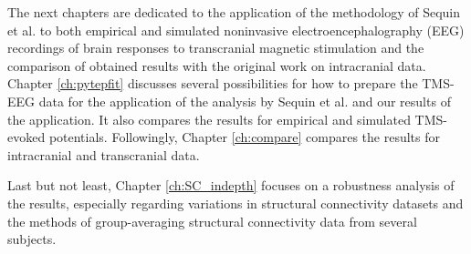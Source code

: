 The next chapters are dedicated to the application of the methodology of Sequin et al. to both empirical and simulated noninvasive electroencephalography (EEG) recordings of brain responses to transcranial magnetic stimulation and the comparison of obtained results with the original work on intracranial data. Chapter \ref{ch:pytepfit} discusses several possibilities for how to prepare the TMS-EEG data for the application of the analysis by Sequin et al. and our results of the application. It also compares the results for empirical and simulated TMS-evoked potentials. Followingly, Chapter \ref{ch:compare} compares the results for intracranial and transcranial data.

Last but not least, Chapter \ref{ch:SC_indepth} focuses on a robustness analysis of the results, especially regarding variations in structural connectivity datasets and the methods of group-averaging structural connectivity data from several subjects.


